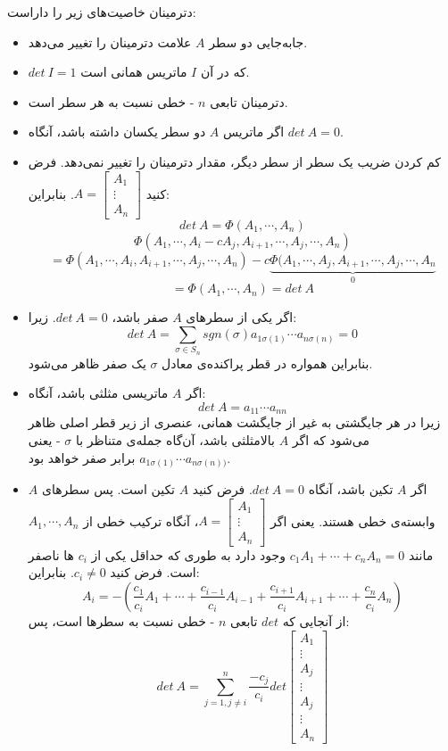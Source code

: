 
دترمینان خاصیت‌های زیر را داراست:
\begin{itemize}
	\item جا‌به‌جایی دو سطر $A$ علامت دترمینان را تغییر می‌دهد.
	\item $det\: I = 1$ که در آن $I$ ماتریس همانی است.
	\item دترمینان تابعی $n$ - خطی نسبت به هر سطر است.
	\item اگر ماتریس $A$ دو سطر یکسان داشته باشد، آنگاه $det\: A = 0$.
	\item کم کردن ضریب یک سطر از سطر دیگر، مقدار دترمینان را تغییر نمی‌دهد. فرض کنید ${A = \begin{bmatrix}
		A_1 \\ \vdots \\ A_n
		\end{bmatrix}}$.
	بنابراین:
	$$det\: A = \Phi (A_1,\cdots , A_n)$$
	$$\Phi(A_1, \cdots,A_i - cA_j,A_{i+1}, \cdots , A_j , \cdots , A_n)$$
	$$= \Phi (A_1,\cdots, A_i, A_{i+1}, \cdots , A_j, \cdots,A_n) - c \underbrace{\Phi (A_1, \cdots, A_j, A_{i+1} , \cdots ,A_j,\cdots, A_n}_{0} $$
	$$= \Phi (A_1,\cdots,A_n) = det\: A$$
	\item اگر یکی از سطر‌های $A$ صفر باشد، $det\: A = 0$. زیرا:
	$$det\: A = \sum_{\sigma\in S_n} sgn (\sigma) a_{1\sigma(1)}\cdots a_{n\sigma(n)} = 0$$
	بنابراین همواره در قطر پراکنده‌ی معادل $\sigma$ یک صفر ظاهر می‌شود.
	\item اگر $A$ ماتریسی مثلثی باشد، آنگاه:
	$$det\: A = a_{11} \cdots a_{nn}$$
	زیرا در هر جایگشتی به غیر از جایگشت همانی، عنصری از زیر قطر اصلی ظاهر می‌شود که اگر $A$ بالامثلثی باشد، آن‌گاه جمله‌ی متناظر با $\sigma$ - یعنی
	$a_{1\sigma(1)} \cdots a_{n\sigma(n))} $
	برابر صفر خواهد بود.
	\item اگر $A$ تکین باشد، آنگاه $det\: A = 0$.
	فرض کنید $A$ تکین است. پس سطر‌های $A$ وابسته‌ی خطی هستند. یعنی اگر $A = \begin{bmatrix}
	A_1\\\vdots \\ A_n
	\end{bmatrix}$، آنگاه ترکیب خطی از $A_1, \cdots , A_n$ مانند ${c_1A_1+ \cdots+ c_nA_n = 0}$ وجود دارد به طوری که حداقل یکی از $c_i$ ها ناصفر است. فرض کنید $c_i\neq 0$. بنابراین:
	$$A_i = -(\frac{c_1}{c_i}A_1 + \cdots+ \frac{c_{i-1}}{c_i}A_{i-1}+ \frac{c_{i+1}}{c_i}A_{i+1}+ \cdots+ \frac{c_n}{c_i}A_n)$$
	از آنجایی که $det$ تابعی $n$ - خطی نسبت به سطر‌ها است، پس:
	$$det\: A = \sum_{{j=1 ,j\neq i}}^n \frac{-c_j}{c_i} det \begin{bmatrix}
	A_1\\ \vdots \\ A_j \\ \vdots \\ A_j\\ \vdots \\ A_n 

\end{bmatrix}$$
\end{itemize}
